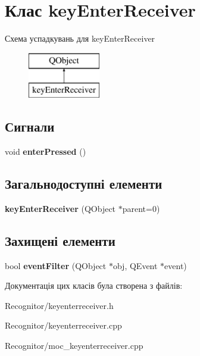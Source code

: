 \hypertarget{classkeyEnterReceiver}{\section{Клас key\-Enter\-Receiver}
\label{classkeyEnterReceiver}
}
Схема успадкувань для key\-Enter\-Receiver\begin{figure}[H]
\begin{center}
\leavevmode
\includegraphics[height=2.000000cm]{classkeyEnterReceiver}
\end{center}
\end{figure}
\subsection*{Сигнали}
\begin{DoxyCompactItemize}
\item 
\hypertarget{classkeyEnterReceiver_af453b7b9a6b24cd91cf93fd3aabec434}{void {\bfseries enter\-Pressed} ()}\label{classkeyEnterReceiver_af453b7b9a6b24cd91cf93fd3aabec434}

\end{DoxyCompactItemize}
\subsection*{Загальнодоступні елементи}
\begin{DoxyCompactItemize}
\item 
\hypertarget{classkeyEnterReceiver_a36041eba96b5ddfc4118cfc6a9f2d252}{{\bfseries key\-Enter\-Receiver} (Q\-Object $\ast$parent=0)}\label{classkeyEnterReceiver_a36041eba96b5ddfc4118cfc6a9f2d252}

\end{DoxyCompactItemize}
\subsection*{Захищені елементи}
\begin{DoxyCompactItemize}
\item 
\hypertarget{classkeyEnterReceiver_af13c717478e5b9d91334c9829bc016e0}{bool {\bfseries event\-Filter} (Q\-Object $\ast$obj, Q\-Event $\ast$event)}\label{classkeyEnterReceiver_af13c717478e5b9d91334c9829bc016e0}

\end{DoxyCompactItemize}


Документація цих класів була створена з файлів\-:\begin{DoxyCompactItemize}
\item 
Recognitor/keyenterreceiver.\-h\item 
Recognitor/keyenterreceiver.\-cpp\item 
Recognitor/moc\-\_\-keyenterreceiver.\-cpp\end{DoxyCompactItemize}
